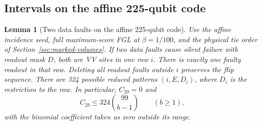 \documentclass[10pt,twocolumn]{article}
\newtheorem{lemma}[theorem]{Lemma}
\theoremstyle{definition}
\begin{document}
\subsection{Intervals on the affine 225-qubit code}\label{app:pilot}
\begin{lemma}[Two data faults on the affine 225-qubit code]\label{lem:affine-row}
Use the affine incidence seed, full maximum-score FGL at $\beta=1/100$,
and the physical tie order of Section~\ref{sec:marked-volumes}.
If two data faults cause silent failure
with readout mask $D$, both are VV sites in one row $i$. There is exactly
one faulty readout in that row. Deleting all readout faults outside $i$
preserves the flip sequence. There are 324 possible reduced patterns
$(i,E,D_i)$, where $D_i$ is the restriction to the row. In particular,
$C_{20}=0$ and
\[
 C_{2b}\le324\binom{99}{b-1}\qquad (b\ge1),
\]
with the binomial coefficient taken as zero outside its range.
\end{lemma}
\end{document}
